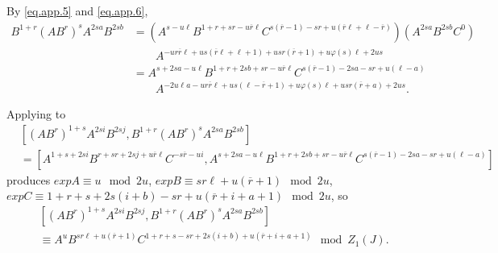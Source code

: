 \documentclass{amsart}
\theoremstyle{definition}
\theoremstyle{remark}
\begin{document}
By \eqref{eq.app.5} and \eqref{eq.app.6},
\begin{equation}\label{eq.imp.2}
    \begin{split}
        B^{1+r} (AB^r)^s A^{2sa} B^{2sb}
        &= (A^{s - u\ell} B^{1 + r + sr - u\overline{r}\ell} C^{s(\overline{r} - 1) - sr + u(\overline{r}\ell + \ell - \overline{r})}) (A^{2sa} B^{2sb} C^0)\\
        &\qquad A^{-ur\overline{r}\ell + us(\overline{r}\ell + \ell + 1) + usr(\overline{r} + 1) + u\varphi(s)\ell + 2us}\\
        &= A^{s + 2sa - u\ell} B^{1 + r + 2sb + sr - u\overline{r}\ell} C^{s(\overline{r} - 1) - 2sa - sr + u(\ell - a)}\\
        &\qquad A^{-2u\ell a - ur\overline{r}\ell + us(\ell - \overline{r} + 1) + u\varphi(s)\ell + usr(\overline{r} + a) + 2us}.
    \end{split}
\end{equation}

Applying \cite[Theorem 3.4]{MS3} to
\begin{align*}
    &[(AB^r)^{1+s} A^{2si} B^{2sj},B^{1+r} (AB^r)^s A^{2sa} B^{2sb}]\\
    &= [A^{1 + s + 2si} B^{r + sr + 2sj + u\overline{r}\ell} C^{-s\overline{r} - ui},
    A^{s + 2sa - u\ell} B^{1 + r + 2sb + sr - u\overline{r}\ell} C^{s(\overline{r} - 1) - 2sa - sr + u(\ell - a)}]
\end{align*}
produces
$expA\equiv u\mod 2u$,
$expB\equiv sr\ell + u(\overline{r} + 1)\mod 2u$,
$expC\equiv 1 + r + s + 2s(i + b) - sr + u(\overline{r} + i + a + 1)\mod 2u$, so
\begin{equation}\label{cong.comm.1}
    \begin{split}
        &[(AB^r)^{1+s} A^{2si} B^{2sj},B^{1+r} (AB^r)^s A^{2sa} B^{2sb}]\\
        &\equiv A^u B^{sr\ell + u(\overline{r} + 1)} C^{1 + r + s - sr + 2s(i + b) + u(\overline{r} + i+ a + 1)}\mod Z_1(J).
    \end{split}
\end{equation}
\end{document}
